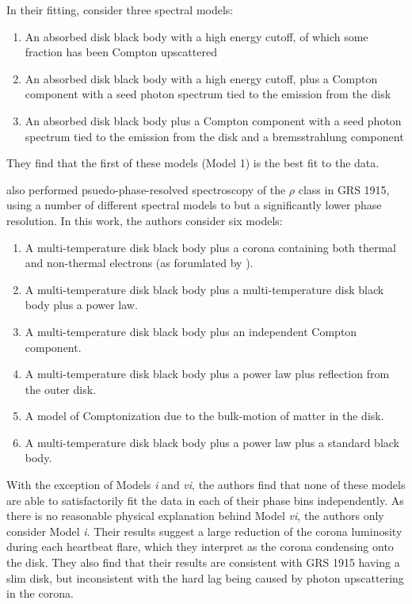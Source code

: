\par In their fitting, \citealp{Neilsen_GRSModel} consider three spectral models:
\begin{enumerate}
\item An absorbed disk black body with a high energy cutoff, of which some fraction has been Compton upscattered
\item An absorbed disk black body with a high energy cutoff, plus a Compton component with a seed photon spectrum tied to the emission from the disk
\item An absorbed disk black body plus a Compton component with a seed photon spectrum tied to the emission from the disk and a bremsstrahlung component
\end{enumerate}
They find that the first of these models (Model 1) is the best fit to the data.
\par \citealp{Mineo_PhasRes} also performed psuedo-phase-resolved spectroscopy of the $\rho$ class in GRS 1915, using a number of different spectral models to \citealp{Neilsen_GRSModel} but a significantly lower phase resolution.  In this work, the authors consider six models:
\begin{enumerate}
\item A multi-temperature disk black body plus a corona containing both thermal and non-thermal electrons (as forumlated by \citealp{Poutanen_Hybrid}).
\item A multi-temperature disk black body plus a multi-temperature disk black body plus a power law.
\item A multi-temperature disk black body plus an independent Compton component.
\item A multi-temperature disk black body plus a power law plus reflection from the outer disk.
\item A model of Comptonization due to the bulk-motion of matter in the disk.
\item A multi-temperature disk black body plus a power law plus a standard black body.
\end{enumerate}
With the exception of Models \textit{i} and \textit{vi}, the authors find that none of these models are able to satisfactorily fit the data in each of their phase bins independently.  As there is no reasonable physical explanation behind Model \textit{vi}, the authors only consider Model \textit{i}.  Their results suggest a large reduction of the corona luminosity during each heartbeat flare, which they interpret as the corona condensing onto the disk.  They also find that their results are consistent with GRS 1915 having a slim disk, but inconsistent with the hard lag being caused by photon upscattering in the corona.
